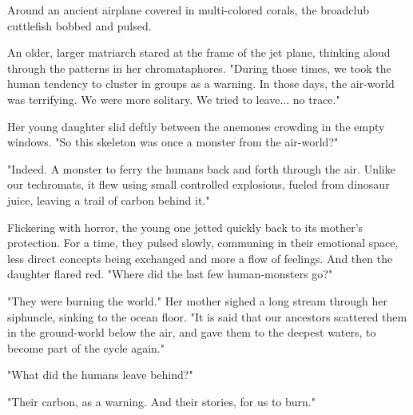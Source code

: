 Around an ancient airplane covered in multi-colored corals, the
broadclub cuttlefish bobbed and pulsed.

An older, larger matriarch stared at the frame of the jet plane,
thinking aloud through the patterns in her chromataphores. "During those
times, we took the human tendency to cluster in groups as a warning. In
those days, the air-world was terrifying. We were more solitary. We
tried to leave... no trace."

Her young daughter slid deftly between the anemones crowding in the
empty windows. "So this skeleton was once a monster from the air-world?"

"Indeed. A monster to ferry the humans back and forth through the air.
Unlike our techromats, it flew using small controlled explosions, fueled
from dinosaur juice, leaving a trail of carbon behind it."

Flickering with horror, the young one jetted quickly back to its
mother's protection. For a time, they pulsed slowly, communing in their
emotional space, less direct concepts being exchanged and more a flow of
feelings. And then the daughter flared red. "Where did the last few
human-monsters go?"

"They were burning the world." Her mother sighed a long stream through
her siphuncle, sinking to the ocean floor. "It is said that our
ancestors scattered them in the ground-world below the air, and gave
them to the deepest waters, to become part of the cycle again."

"What did the humans leave behind?"

"Their carbon, as a warning. And their stories, for us to burn."
